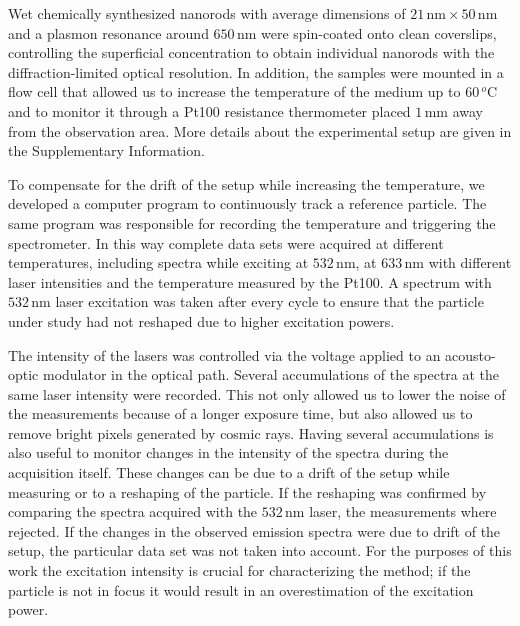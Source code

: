 \documentclass[journal=nalefd,manuscript=letter]{achemso}
\newcommand{\nm}{\ensuremath{\,\textrm{nm}}}
\newcommand{\mm}{\ensuremath{\,\textrm{mm}}}
\newcommand{\degree}{\ensuremath{\,^o\textrm{C}}}
\begin{document}
Wet chemically synthesized nanorods\cite{Nikoobakht2003} with average dimensions
of $21\nm\times50\nm$ and a plasmon resonance around $650\nm$ were spin-coated
onto clean coverslips, controlling the superficial concentration to obtain
individual nanorods with the diffraction-limited optical resolution.
In addition, the samples were mounted in a flow cell that allowed us to increase
the temperature of the medium up to $60\degree$ and to monitor it through a
Pt100 resistance thermometer placed $1\mm$ away from the observation area. More
details about the experimental setup are given in the Supplementary Information.

To compensate for the drift of the setup while increasing the temperature, we
developed a computer program to continuously track a reference particle. The
same program was responsible for recording the temperature and triggering the
spectrometer. In this way complete data sets were acquired at different
temperatures, including spectra while exciting at $532\nm$, at $633\nm$ with
different laser intensities and the temperature measured by the Pt100. A
spectrum with $532\nm$ laser excitation was taken after every cycle to ensure
that the particle under study had not reshaped due to higher excitation powers.

The intensity of the lasers was controlled via the voltage applied to an
acousto-optic modulator in the optical path. Several accumulations of the
spectra at the same laser intensity were recorded. This not only allowed us to
lower the noise of the measurements because of a longer exposure time, but also
allowed us to remove bright pixels generated by cosmic rays. Having several
accumulations is also useful to monitor changes in the intensity of the spectra
during the acquisition itself. These changes can be due to a drift of the setup
while measuring or to a reshaping of the particle. If the reshaping was
confirmed by comparing the spectra acquired with the $532\nm$
laser\cite{Liu2009}, the measurements where rejected. If the changes in the
observed emission spectra were due to drift of the setup, the particular data
set was not taken into account. For the purposes of this work the excitation
intensity is crucial for characterizing the method; if the particle is not in
focus it would result in an overestimation of the excitation power. 

\end{document}
